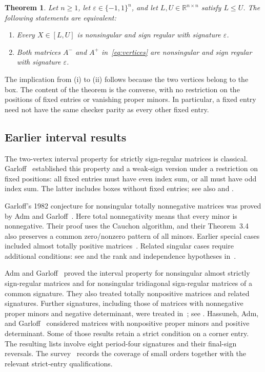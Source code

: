\documentclass[11pt]{article}
\newtheorem{theorem}{Theorem}[section]
\theoremstyle{definition}
\theoremstyle{remark}
\numberwithin{equation}{section}
\newcommand{\R}{\mathbb R}
\newcommand{\eps}{\varepsilon}
\begin{document}
\begin{theorem}\label{thm:main}
Let $n\geq1$, let $\eps\in\{-1,1\}^n$, and let $L,U\in\R^{n\times n}$
satisfy $L\leq U$. The following statements are equivalent:
\begin{enumerate}
\item[(i)] Every $X\in[L,U]$ is nonsingular and sign regular with signature $\eps$.
\item[(ii)] Both matrices $A^-$ and $A^+$ in~\eqref{eq:vertices} are nonsingular
and sign regular with signature $\eps$.
\end{enumerate}
\end{theorem}

The implication from (i) to (ii) follows because the two vertices belong
to the box. The content of the theorem is the converse, with no restriction
on the positions of fixed entries or vanishing proper minors. In
particular, a fixed entry need not have the same checker parity as every
other fixed entry.

\subsection{Earlier interval results}

The two-vertex interval property for strictly sign-regular matrices is
classical. Garloff~\cite{Garloff1982} established this property and a
weak-sign version under a restriction on fixed positions: all fixed
entries must have even index sum, or all must have odd index sum.
The latter includes boxes without fixed entries; see also
\cite[Theorem~3.1]{Survey2016} and
\cite[Theorems~3.2--3.3]{AdmGarloff2026}.

Garloff's 1982 conjecture for nonsingular totally nonnegative matrices
was proved by Adm and Garloff~\cite[Theorem~3.6]{AdmGarloff2013}.
Here total nonnegativity means that every minor is nonnegative.
Their proof uses the Cauchon algorithm, and their Theorem~3.4 also
preserves a common zero/nonzero pattern of all minors. Earlier special
cases included almost totally positive
matrices~\cite{Garloff2003}. Related singular cases require additional
conditions: see \cite[Corollaries~3.7--3.8]{AdmGarloff2013} and the
rank and independence hypotheses in~\cite{Relax2020}.

Adm and Garloff~\cite{AdmGarloff2016} proved the interval property for
nonsingular almost strictly sign-regular matrices and for nonsingular
tridiagonal sign-regular matrices of a common signature. They also treated
totally nonpositive matrices and related signatures. Further signatures,
including those of matrices with nonnegative proper minors and negative
determinant, were treated in~\cite{AdmGarloff2021}; see
\cite[IP~2.8--2.9]{Survey2021}. Hassuneh, Adm, and
Garloff~\cite{HassunehAdmGarloff2025} considered matrices with
nonpositive proper minors and positive determinant. Some of those
results retain a strict condition on a corner entry. The resulting
lists involve eight period-four signatures and their final-sign
reversals. The survey~\cite{AdmGarloff2026} records the coverage of
small orders together with the relevant strict-entry qualifications.
\end{document}
